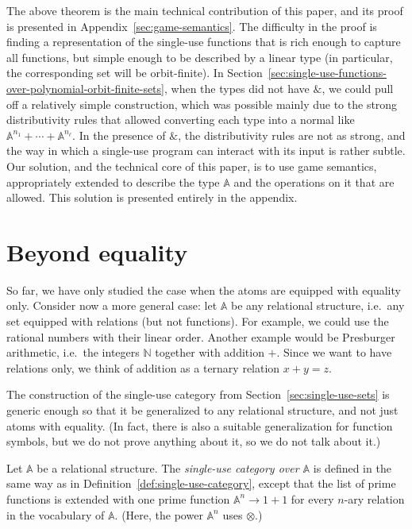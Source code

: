 \documentclass[10pt,a4paper]{amsart}
\numberwithin{equation}{section}
\theoremstyle{plain}
\newcommand{\Nat}{{\mathbb N}}
\newcommand{\atoms}{\mathbb A}
\begin{document}
The above theorem is the main technical contribution of this paper, and its proof is presented in Appendix~\ref{sec:game-semantics}. The difficulty in the proof is finding a representation of the single-use  functions that is rich enough to capture all functions, but simple enough to be described by a linear type (in particular, the corresponding set will be orbit-finite). In  Section~\ref{sec:single-use-functions-over-polynomial-orbit-finite-sets}, when the types did not have $\&$, we could pull off a relatively simple construction, which was possible mainly due to the strong distributivity rules that allowed converting each type into a normal like $\atoms^{n_1} + \cdots + \atoms^{n_\ell}$. In the presence of $\&$, the distributivity rules are not as strong, and the way in which a single-use program can interact with its input is rather subtle. 
Our solution, and the technical core of this paper, is to use game semantics, appropriately extended to describe the type $\atoms$ and the operations on it that are allowed. This solution is presented entirely in the appendix.









\section{Beyond equality}
\label{sec:beyond-equality}

So far, we have only studied the case when the atoms are equipped with equality only. Consider now a more general case: let $\atoms$ be any relational structure, i.e.~any set equipped with relations (but not functions). For example, we could use the rational numbers with their linear order. Another example would be Presburger arithmetic, i.e.~the integers $\Nat$ together with addition $+$. Since we want to have relations only, we think of addition as a ternary relation $x + y =z$. 

The construction of the single-use category from Section~\ref{sec:single-use-sets} is generic enough so that it be generalized to any relational structure, and not just atoms with equality. (In fact, there is also a suitable generalization for function symbols, but we do not prove anything about it, so we do not talk about it.)

\begin{definition}\label{def:single-use-category-relational-structures}
    Let $\atoms$ be a relational structure. The \emph{single-use category over $\atoms$} is defined in the same way as in Definition~\ref{def:single-use-category}, except that the list of prime functions is extended with one prime function  $\atoms^n \to 1 + 1$ 
        for every $n$-ary relation in the vocabulary of $\atoms$. (Here, the power $\atoms^n$ uses $\otimes$.)
\end{definition}
\end{document}
